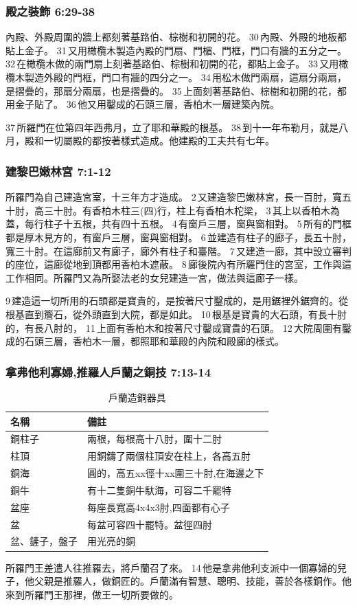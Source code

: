 \subsubsection{殿之裝飾 6:29-38}
內殿、外殿周圍的牆上都刻著基路伯、棕樹和初開的花。 30 內殿、外殿的地板都貼上金子。 31 又用橄欖木製造內殿的門扇、門楣、門框，門口有牆的五分之一。 32 在橄欖木做的兩門扇上刻著基路伯、棕樹和初開的花，都貼上金子。 33 又用橄欖木製造外殿的門框，門口有牆的四分之一。 34 用松木做門兩扇，這扇分兩扇，是摺疊的，那扇分兩扇，也是摺疊的。 35 上面刻著基路伯、棕樹和初開的花，都用金子貼了。 36 他又用鑿成的石頭三層，香柏木一層建築內院。

37 所羅門在位第四年西弗月，立了耶和華殿的根基。 38 到十一年布勒月，就是八月，殿和一切屬殿的都按著樣式造成。他建殿的工夫共有七年。


\subsubsection{建黎巴嫩林宮 7:1-12}
所羅門為自己建造宮室，十三年方才造成。 2 又建造黎巴嫩林宮，長一百肘，寬五十肘，高三十肘。有香柏木柱三(四)行，柱上有香柏木柁梁， 3 其上以香柏木為蓋，每行柱子十五根，共有四十五根。 4 有窗戶三層，窗與窗相對。 5 所有的門框都是厚木見方的，有窗戶三層，窗與窗相對。 6 並建造有柱子的廊子，長五十肘，寬三十肘。在這廊前又有廊子，廊外有柱子和臺階。 7 又建造一廊，其中設立審判的座位，這廊從地到頂都用香柏木遮蔽。 8 廊後院內有所羅門住的宮室，工作與這工作相同。所羅門又為所娶法老的女兒建造一宮，做法與這廊子一樣。

9 建造這一切所用的石頭都是寶貴的，是按著尺寸鑿成的，是用鋸裡外鋸齊的。從根基直到簷石，從外頭直到大院，都是如此。 10 根基是寶貴的大石頭，有長十肘的，有長八肘的， 11 上面有香柏木和按著尺寸鑿成寶貴的石頭。 12 大院周圍有鑿成的石頭三層，香柏木一層，都照耶和華殿的內院和殿廊的樣式。

\subsubsection{拿弗他利寡婦,推羅人戶蘭之銅技 7:13-14}
\begin{table}
\centering
\begin{tabular}{p{2.5cm}|p{7cm}}\hline\hline
名稱      & 備註   \\\hline\hline
銅柱子  &兩根，每根高十八肘，圍十二肘\\\hline
柱頂&用銅鑄了兩個柱頂安在柱上，各高五肘\\\hline
銅海   &圓的，高五xx徑十xx圍三十肘,在海邊之下 \\\hline
銅牛  & 有十二隻銅牛馱海，可容二千罷特 \\\hline
盆座&每座長寬高4x4x3肘,四面都有心子\\\hline
盆&每盆可容四十罷特。盆徑四肘 \\\hline
盆、鏟子，盤子&用光亮的銅\\\hline
\end{tabular}
\caption{戶蘭造銅器具}
\end{table}
所羅門王差遣人往推羅去，將戶蘭召了來。 14 他是拿弗他利支派中一個寡婦的兒子，他父親是推羅人，做銅匠的。戶蘭滿有智慧、聰明、技能，善於各樣銅作。他來到所羅門王那裡，做王一切所要做的。

